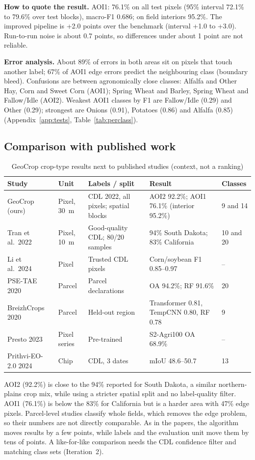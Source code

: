 \textbf{How to quote the result.} AOI1: 76.1\% on all test pixels (95\% interval 72.1\% to 79.6\% over
test blocks), macro-F1 0.686; on field interiors 95.2\%. The improved pipeline is +2.0 points over the
benchmark (interval +1.0 to +3.0). Run-to-run noise is about 0.7 points, so differences under about
1 point are not reliable.

\textbf{Error analysis.} About 89\% of errors in both areas sit on pixels that touch another label;
67\% of AOI1 edge errors predict the neighbouring class (boundary bleed). Confusions are between
agronomically close classes: Alfalfa and Other Hay, Corn and Sweet Corn (AOI1); Spring Wheat and
Barley, Spring Wheat and Fallow/Idle (AOI2). Weakest AOI1 classes by F1 are Fallow/Idle (0.29) and
Other (0.29); strongest are Onions (0.91), Potatoes (0.86) and Alfalfa (0.85)
(Appendix~\ref{app:tests}, Table~\ref{tab:perclass}).

\subsection{Comparison with published work}\label{sec:papers}
\begin{table}[htbp]
\centering\small
\caption{GeoCrop crop-type results next to published studies (context, not a ranking)}
\label{tab:papers}
\begin{tabularx}{\textwidth}{L{2.8cm} L{1.6cm} L{3.3cm} Y L{1.9cm}}
\toprule
\textbf{Study} & \textbf{Unit} & \textbf{Labels / split} & \textbf{Result} & \textbf{Classes}\\
\midrule
GeoCrop (ours) & Pixel, 30~m & CDL 2022, all pixels; spatial blocks & AOI2 92.2\%; AOI1 76.1\% (interior 95.2\%) & 9 and 14\\
Tran et al.\ 2022~\cite{tran2022} & Pixel, 10~m & Good-quality CDL; 80/20 samples & 94\% South Dakota; 83\% California & 10 and 20\\
Li et al.\ 2024~\cite{li2024} & Pixel & Trusted CDL pixels & Corn/soybean F1 0.85--0.97 & --\\
PSE-TAE 2020~\cite{garnot2020} & Parcel & Parcel declarations & OA 94.2\%; RF 91.6\% & 20\\
BreizhCrops 2020~\cite{russwurm2020} & Parcel & Held-out region & Transformer 0.81, TempCNN 0.80, RF 0.78 & 9\\
Presto 2023~\cite{tseng2023} & Pixel series & Pre-trained & S2-Agri100 OA 68.9\% & --\\
Prithvi-EO-2.0 2024~\cite{szwarcman2024} & Chip & CDL, 3 dates & mIoU 48.6--50.7 & 13\\
\bottomrule
\end{tabularx}
\end{table}
AOI2 (92.2\%) is close to the 94\% reported for South Dakota, a similar northern-plains crop mix,
while using a stricter spatial split and no label-quality filter. AOI1 (76.1\%) is below the 83\% for
California but is a harder area with 47\% edge pixels. Parcel-level studies classify whole fields,
which removes the edge problem, so their numbers are not directly comparable. As in the papers, the
algorithm moves results by a few points, while labels and the evaluation unit move them by tens of
points. A like-for-like comparison needs the CDL confidence filter and matching class sets
(Iteration~2).

